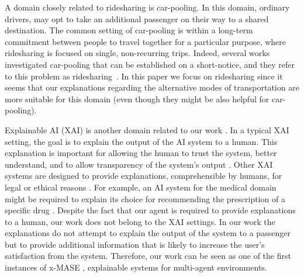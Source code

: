 \documentclass[letterpaper]{article} %
\begin{document}
A domain closely related to ridesharing is car-pooling. In this domain, ordinary drivers, may opt to take an additional passenger on their way to a shared destination. The common setting of car-pooling is within a long-term commitment between people to travel together for a particular purpose, where ridesharing is focused on single, non-recurring trips. 
Indeed, several works investigated car-pooling that can be established on a short-notice, and they refer to this problem as ridesharing~\cite{agatz2012optimization}. 
In this paper we focus on ridesharing since it seems that our explanations regarding the alternative modes of transportation are more suitable for this domain (even though they might be also helpful for car-pooling).



Explainable AI (XAI) is another domain related to our work \cite{core2006building,gunning2017explainable,carvalho2019machine}. In a typical XAI setting, the goal is to explain the output of the AI system to a human. This explanation is important for allowing the human to trust the system, better understand, and to allow transparency of the system's output \cite{adadi2018peeking}. Other XAI systems are designed to provide explanations, comprehensible by humans, for legal or ethical reasons \cite{doran2017does}. For example, an AI system for the medical domain might be required to explain its choice for recommending the prescription of a specific drug \cite{holzinger2017we}. %
Despite the fact that our agent is required to provide explanations to a human, our work does not belong to the XAI settings. In our work the explanations do not attempt to explain the output of the system to a passenger but to provide additional information that is likely to increase the user's satisfaction from the system. Therefore, our work can be seen as one of the first instances of x-MASE \cite{Kraus2019ai}, explainable systems for multi-agent environments.
\end{document}
